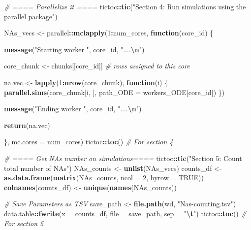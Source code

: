 \documentclass[
]{article}
\newenvironment{Shaded}{\begin{snugshade}}{\end{snugshade}}
\newcommand{\AttributeTok}[1]{\textcolor[rgb]{0.13,0.29,0.53}{#1}}
\newcommand{\CommentTok}[1]{\textcolor[rgb]{0.56,0.35,0.01}{\textit{#1}}}
\newcommand{\ConstantTok}[1]{\textcolor[rgb]{0.56,0.35,0.01}{#1}}
\newcommand{\ControlFlowTok}[1]{\textcolor[rgb]{0.13,0.29,0.53}{\textbf{#1}}}
\newcommand{\DecValTok}[1]{\textcolor[rgb]{0.00,0.00,0.81}{#1}}
\newcommand{\FunctionTok}[1]{\textcolor[rgb]{0.13,0.29,0.53}{\textbf{#1}}}
\newcommand{\NormalTok}[1]{#1}
\newcommand{\OtherTok}[1]{\textcolor[rgb]{0.56,0.35,0.01}{#1}}
\newcommand{\SpecialCharTok}[1]{\textcolor[rgb]{0.81,0.36,0.00}{\textbf{#1}}}
\newcommand{\StringTok}[1]{\textcolor[rgb]{0.31,0.60,0.02}{#1}}
\begin{document}
\begin{Shaded}
\begin{Highlighting}[]
\CommentTok{\# ==== Parallelize it ====}
\NormalTok{tictoc}\SpecialCharTok{::}\FunctionTok{tic}\NormalTok{(}\StringTok{"Section 4: Run simulations using the parallel package"}\NormalTok{)}

\NormalTok{NAs\_vecs }\OtherTok{\textless{}{-}}\NormalTok{ parallel}\SpecialCharTok{::}\FunctionTok{mclapply}\NormalTok{(}\DecValTok{1}\SpecialCharTok{:}\NormalTok{num\_cores, }\ControlFlowTok{function}\NormalTok{(core\_id) \{}
  
  \FunctionTok{message}\NormalTok{(}\StringTok{"Starting worker "}\NormalTok{, core\_id, }\StringTok{"....}\SpecialCharTok{\textbackslash{}n}\StringTok{"}\NormalTok{)}
  
\NormalTok{  core\_chunk }\OtherTok{\textless{}{-}}\NormalTok{ chunks[[core\_id]]  }\CommentTok{\# rows assigned to this core}
  
\NormalTok{  na.vec }\OtherTok{\textless{}{-}} \FunctionTok{lapply}\NormalTok{(}\DecValTok{1}\SpecialCharTok{:}\FunctionTok{nrow}\NormalTok{(core\_chunk), }\ControlFlowTok{function}\NormalTok{(i) \{}
    \FunctionTok{parallel.sims}\NormalTok{(core\_chunk[i, ], }
    \AttributeTok{path\_ODE =}\NormalTok{ workers\_ODE[core\_id])}
\NormalTok{  \})}
  
  \FunctionTok{message}\NormalTok{(}\StringTok{"Ending worker "}\NormalTok{, core\_id, }\StringTok{"....}\SpecialCharTok{\textbackslash{}n}\StringTok{"}\NormalTok{)}
  
  \FunctionTok{return}\NormalTok{(na.vec)}
  
\NormalTok{\}, }\AttributeTok{mc.cores =}\NormalTok{ num\_cores)}
\NormalTok{tictoc}\SpecialCharTok{::}\FunctionTok{toc}\NormalTok{() }\CommentTok{\# For section 4}


\CommentTok{\# ==== Get NAs number on simulations====}
\NormalTok{tictoc}\SpecialCharTok{::}\FunctionTok{tic}\NormalTok{(}\StringTok{"Section 5: Count total number of NAs"}\NormalTok{)}
\NormalTok{NAs\_counts }\OtherTok{\textless{}{-}} \FunctionTok{unlist}\NormalTok{(NAs\_vecs)}
\NormalTok{counts\_df }\OtherTok{\textless{}{-}} \FunctionTok{as.data.frame}\NormalTok{(}\FunctionTok{matrix}\NormalTok{(NAs\_counts, }\AttributeTok{ncol =} \DecValTok{2}\NormalTok{, }\AttributeTok{byrow =} \ConstantTok{TRUE}\NormalTok{))}
\FunctionTok{colnames}\NormalTok{(counts\_df) }\OtherTok{\textless{}{-}} \FunctionTok{unique}\NormalTok{(}\FunctionTok{names}\NormalTok{(NAs\_counts))}

\CommentTok{\# Save Parameters as TSV}
\NormalTok{save\_path }\OtherTok{\textless{}{-}} \FunctionTok{file.path}\NormalTok{(wd, }\StringTok{"Nas{-}counting.tsv"}\NormalTok{)}
\NormalTok{data.table}\SpecialCharTok{::}\FunctionTok{fwrite}\NormalTok{(}\AttributeTok{x =}\NormalTok{ counts\_df, }\AttributeTok{file =}\NormalTok{ save\_path, }\AttributeTok{sep =} \StringTok{"}\SpecialCharTok{\textbackslash{}t}\StringTok{"}\NormalTok{)}
\NormalTok{tictoc}\SpecialCharTok{::}\FunctionTok{toc}\NormalTok{() }\CommentTok{\# For section 5}
\end{Highlighting}
\end{Shaded}
\end{document}
